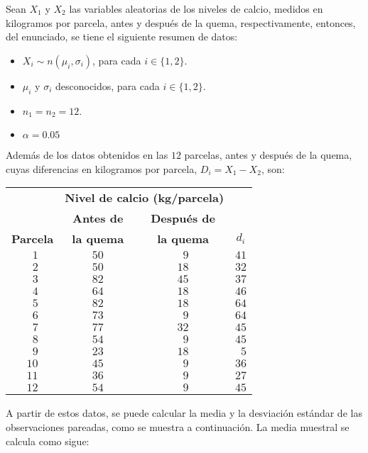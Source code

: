 \begin{solucion}
 Sean $X_1$ y $X_2$ las variables aleatorias de los niveles de calcio, medidos en kilogramos por parcela, antes y despu\'es de la quema, respectivamente, entonces, del enunciado, se tiene el siguiente resumen de datos:
 \begin{itemize}
  \item $X_i \sim n\left( \mu_i, \sigma_i \right)$, para cada $i \in \{ 1,2 \}$.
  \item $\mu_i$ y $\sigma_i$ desconocidos, para cada $i \in \{ 1, 2 \}$.
  \item $n_1 = n_2 = 12$.
  \item $\alpha = 0.05$
 \end{itemize}
 Adem\'as de los datos obtenidos en las $12$ parcelas, antes y despu\'es de la quema, cuyas diferencias en kilogramos por parcela, $D_i = X_1 - X_2$, son:
 \begin{center}
  \begin{tabular}{cccc}
   & \multicolumn{2}{c}{\hspace{-0.5cm} \textbf{Nivel de calcio (kg/parcela)}} \\
   & \textbf{Antes de} & \textbf{Despu\'es de} \\
   \textbf{Parcela} & \textbf{la quema} & \textbf{la quema} & $d_i$ \\
   \hline 
   $\phantom{1}1$ & $50$ &  $\phantom{1}9$ & $41$ \\
   $\phantom{1}2$ & $50$ & $18$ & $32$ \\
   $\phantom{1}3$ & $82$ & $45$ & $37$ \\
   $\phantom{1}4$ & $64$ & $18$ & $46$ \\
   $\phantom{1}5$ & $82$ & $18$ & $64$ \\
   $\phantom{1}6$ & $73$ & $\phantom{1}9$ & $64$ \\
   $\phantom{1}7$ & $77$ & $32$ & $45$ \\
   $\phantom{1}8$ & $54$ & $\phantom{1}9$ & $45$ \\
   $\phantom{1}9$ & $23$ & $18$ & $\phantom{4}5$ \\
   $10$ & $45$ & $\phantom{1}9$ & $36$ \\
   $11$ & $36$ & $\phantom{1}9$ & $27$ \\
   $12$ & $54$ & $\phantom{1}9$ & $45$
  \end{tabular}
 \end{center}
 A partir de estos datos, se puede calcular la media y la desviaci\'on est\'andar de las observaciones pareadas, como se muestra a continuaci\'on. La media muestral se calcula como sigue:

\end{solucion}
